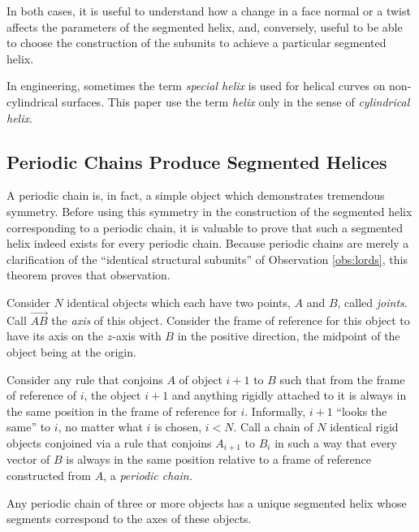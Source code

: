 \documentclass[mathematics,article,submit,pdftex,moreauthors]{Definitions/mdpi}
\begin{document}
In both cases, it is useful to understand how a change in a face normal
or a twist affects the parameters
of the segmented helix,
and, conversely, useful to be able to choose the construction
of the subunits to achieve a particular segmented helix.

In engineering, sometimes the term {\em special helix} \cite{gu2012research}
is used for helical curves on non-cylindrical surfaces.
This paper use the term {\em helix} only in the
sense of {\em cylindrical helix}.

\subsection{Periodic Chains Produce Segmented Helices}

A periodic chain is, in fact, a simple object which demonstrates tremendous symmetry.
Before using this symmetry in the construction of the segmented helix corresponding to a periodic chain,
it is valuable to
prove that such a segmented helix indeed exists for every periodic chain.
Because periodic chains are merely a clarification of the ``identical structural subunits''
of Observation \ref{obs:lords},
this theorem proves that observation.

\begin{Theorem}
  \label{thm:helix}
  Consider $N$ identical objects which each have two points, $A$ and $B$, called {\em joints}. Call
  $\overrightarrow{AB}$ the {\em axis} of this object.
  Consider the frame of reference for this object to have
  its axis on the $z$-axis with $B$ in the positive direction, the
  midpoint of the object being at the origin.

  Consider any rule that conjoins $A$ of object $i+1$ to $B$ such that
  from the frame of reference of $i$, the object $i+1$ and anything rigidly
  attached to it is always in the same position in the frame of reference for $i$.
  Informally, $i+1$ ``looks the same'' to $i$, no matter what $i$ is chosen, $i < N$.
  Call a chain of $N$ identical rigid objects conjoined via a rule that
  conjoins $A_{i+1}$ to $B_i$ in such a way that every vector
  of $B$ is always in the same position relative to a frame of reference
  constructed from $A$, a {\em periodic chain.}

  Any periodic chain of three or more objects has a unique segmented helix
  whose segments correspond
  to the axes of these objects.
\end{Theorem}
\end{document}
